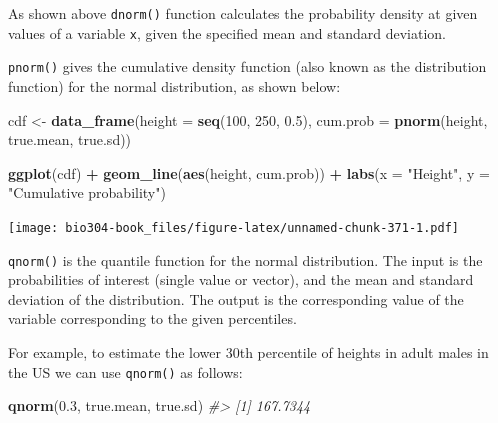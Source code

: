 \documentclass[]{book}
\newenvironment{Shaded}{\begin{snugshade}}{\end{snugshade}}
\newcommand{\CommentTok}[1]{\textcolor[rgb]{0.56,0.35,0.01}{\textit{#1}}}
\newcommand{\DataTypeTok}[1]{\textcolor[rgb]{0.13,0.29,0.53}{#1}}
\newcommand{\DecValTok}[1]{\textcolor[rgb]{0.00,0.00,0.81}{#1}}
\newcommand{\FloatTok}[1]{\textcolor[rgb]{0.00,0.00,0.81}{#1}}
\newcommand{\KeywordTok}[1]{\textcolor[rgb]{0.13,0.29,0.53}{\textbf{#1}}}
\newcommand{\NormalTok}[1]{#1}
\newcommand{\OperatorTok}[1]{\textcolor[rgb]{0.81,0.36,0.00}{\textbf{#1}}}
\newcommand{\StringTok}[1]{\textcolor[rgb]{0.31,0.60,0.02}{#1}}
\theoremstyle{definition}
\theoremstyle{definition}
\theoremstyle{definition}
\theoremstyle{remark}
\begin{document}
As shown above \texttt{dnorm()} function calculates the probability
density at given values of a variable \texttt{x}, given the specified
mean and standard deviation.

\texttt{pnorm()} gives the cumulative density function (also known as
the distribution function) for the normal distribution, as shown below:

\begin{Shaded}
\begin{Highlighting}[]
\NormalTok{cdf <-}
\StringTok{  }\KeywordTok{data_frame}\NormalTok{(}\DataTypeTok{height =} \KeywordTok{seq}\NormalTok{(}\DecValTok{100}\NormalTok{, }\DecValTok{250}\NormalTok{, }\FloatTok{0.5}\NormalTok{),}
             \DataTypeTok{cum.prob =} \KeywordTok{pnorm}\NormalTok{(height, true.mean, true.sd))}

\KeywordTok{ggplot}\NormalTok{(cdf) }\OperatorTok{+}
\StringTok{  }\KeywordTok{geom_line}\NormalTok{(}\KeywordTok{aes}\NormalTok{(height, cum.prob)) }\OperatorTok{+}
\StringTok{  }\KeywordTok{labs}\NormalTok{(}\DataTypeTok{x =} \StringTok{"Height"}\NormalTok{, }\DataTypeTok{y =} \StringTok{"Cumulative probability"}\NormalTok{)}
\end{Highlighting}
\end{Shaded}

\texttt{[image: bio304-book\_files/figure-latex/unnamed-chunk-371-1.pdf]}

\texttt{qnorm()} is the quantile function for the normal distribution.
The input is the probabilities of interest (single value or vector), and
the mean and standard deviation of the distribution. The output is the
corresponding value of the variable corresponding to the given
percentiles.

For example, to estimate the lower 30th percentile of heights in adult
males in the US we can use \texttt{qnorm()} as follows:

\begin{Shaded}
\begin{Highlighting}[]
\KeywordTok{qnorm}\NormalTok{(}\FloatTok{0.3}\NormalTok{, true.mean, true.sd)}
\CommentTok{#> [1] 167.7344}
\end{Highlighting}
\end{Shaded}
\end{document}

